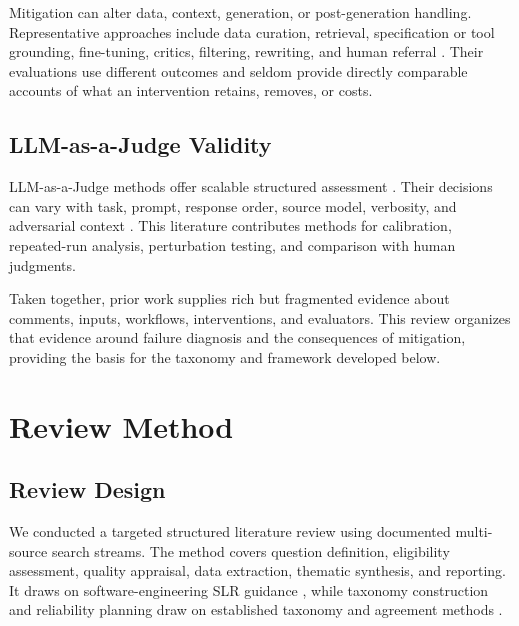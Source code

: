 \documentclass[10pt]{article}
\begin{document}
Mitigation can alter data, context, generation, or post-generation handling. Representative approaches include data curation, retrieval, specification or tool grounding, fine-tuning, critics, filtering, rewriting, and human referral \cite{p08_liu2025_too_noisy,p09_ren2025_hydra_reviewer,p11_zhang2025_laura,p12_wang2025_sgcr,p22_jaoua2025_static_analyzers,p24_bensghaier2025_reward_models,p35_mcaleese2024_llm_critics}. Their evaluations use different outcomes and seldom provide directly comparable accounts of what an intervention retains, removes, or costs.

\subsection{LLM-as-a-Judge Validity}

LLM-as-a-Judge methods offer scalable structured assessment \cite{m04_zheng2023_llm_judge,p29_wang2025_human_evaluators,p31_jiang2025_codejudgebench,p33_he2025_llmjudge_se,p36_li2024_llms_as_judges}. Their decisions can vary with task, prompt, response order, source model, verbosity, and adversarial context \cite{p30_weyssow2025_codeultrafeedback,p32_zhao2026_bias_loop,p63_mitropoulos2026_confirmation_bias,p64_thornton2026_adversarial_comments}. This literature contributes methods for calibration, repeated-run analysis, perturbation testing, and comparison with human judgments.

Taken together, prior work supplies rich but fragmented evidence about comments, inputs, workflows, interventions, and evaluators. This review organizes that evidence around failure diagnosis and the consequences of mitigation, providing the basis for the taxonomy and framework developed below.




\section{Review Method}

\subsection{Review Design}

We conducted a targeted structured literature review using documented multi-source search streams. The method covers question definition, eligibility assessment, quality appraisal, data extraction, thematic synthesis, and reporting. It draws on software-engineering SLR guidance \cite{m00_kitchenham2007_slr_guidelines}, while taxonomy construction and reliability planning draw on established taxonomy and agreement methods \cite{m01_nickerson2013_taxonomy,m02_cohen1960_kappa,m03_krippendorff2018_content_analysis}.
\end{document}

